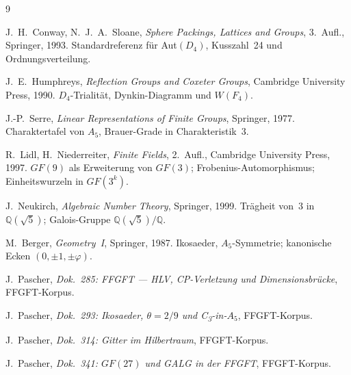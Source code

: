 \begin{thebibliography}{9}

J.~H.~Conway, N.~J.~A.~Sloane,
\textit{Sphere Packings, Lattices and Groups},
3.~Aufl., Springer, 1993.
Standardreferenz für Aut$(D_4)$, Kusszahl~24 und Ordnungsverteilung.

J.~E.~Humphreys,
\textit{Reflection Groups and Coxeter Groups},
Cambridge University Press, 1990.
$D_4$-Trialität, Dynkin-Diagramm und $W(F_4)$.

J.-P.~Serre,
\textit{Linear Representations of Finite Groups},
Springer, 1977.
Charaktertafel von $A_5$, Brauer-Grade in Charakteristik~3.

R.~Lidl, H.~Niederreiter,
\textit{Finite Fields},
2.~Aufl., Cambridge University Press, 1997.
$GF(9)$ als Erweiterung von $GF(3)$; Frobenius-Automorphismus;
Einheitswurzeln in $GF(3^k)$.

J.~Neukirch,
\textit{Algebraic Number Theory},
Springer, 1999.
Trägheit von~$3$ in $\mathbb{Q}(\sqrt5)$; Galois-Gruppe $\mathbb{Q}(\sqrt5)/\mathbb{Q}$.

M.~Berger,
\textit{Geometry~I},
Springer, 1987.
Ikosaeder, $A_5$-Symmetrie; kanonische Ecken $(0,\pm1,\pm\varphi)$.

J.~Pascher,
\textit{Dok.~285: FFGFT --- HLV, CP-Verletzung und Dimensionsbrücke},
FFGFT-Korpus.

J.~Pascher,
\textit{Dok.~293: Ikosaeder, $\theta=2/9$ und C\textsubscript{3}-in-$A_5$},
FFGFT-Korpus.

J.~Pascher,
\textit{Dok.~314: Gitter im Hilbertraum},
FFGFT-Korpus.

J.~Pascher,
\textit{Dok.~341: $GF(27)$ und GALG in der FFGFT},
FFGFT-Korpus.

\end{thebibliography}
